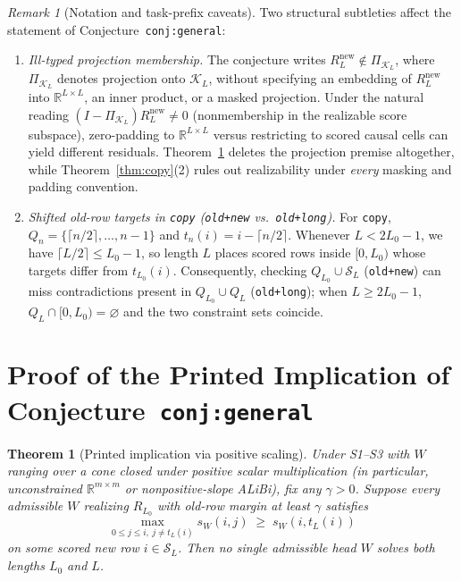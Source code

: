 \documentclass[11pt]{article}
\theoremstyle{plain}
\newtheorem{theorem}{Theorem}
\theoremstyle{definition}
\theoremstyle{remark}
\newtheorem{remark}{Remark}
\begin{document}
\begin{remark}[Notation and task-prefix caveats]\label{rmk:caveats}
Two structural subtleties affect the statement of Conjecture~\texttt{conj:general}:
\begin{enumerate}[label=\textup{(\arabic*)},itemsep=2pt]
\item \emph{Ill-typed projection membership.} The conjecture writes $R_L^{\mathrm{new}} \notin \Pi_{\mathcal{K}_L}$, where $\Pi_{\mathcal{K}_L}$ denotes projection onto $\mathcal{K}_L$, without specifying an embedding of $R_L^{\mathrm{new}}$ into $\mathbb{R}^{L \times L}$, an inner product, or a masked projection. Under the natural reading $(I - \Pi_{\mathcal{K}_L}) R_L^{\mathrm{new}} \neq 0$ (nonmembership in the realizable score subspace), zero-padding to $\mathbb{R}^{L \times L}$ versus restricting to scored causal cells can yield different residuals. Theorem~\ref{thm:printed} deletes the projection premise altogether, while Theorem~\ref{thm:copy}(2) rules out realizability under \emph{every} masking and padding convention.
\item \emph{Shifted old-row targets in \texttt{copy} (\texttt{old+new} vs.\ \texttt{old+long}).} For \texttt{copy}, $Q_n = \{\lceil n/2 \rceil, \dots, n - 1\}$ and $t_n(i) = i - \lceil n/2 \rceil$. Whenever $L < 2L_0 - 1$, we have $\lceil L/2 \rceil \le L_0 - 1$, so length $L$ places scored rows inside $[0, L_0)$ whose targets differ from $t_{L_0}(i)$. Consequently, checking $Q_{L_0} \cup \mathcal{S}_L$ (\texttt{old+new}) can miss contradictions present in $Q_{L_0} \cup Q_L$ (\texttt{old+long}); when $L \ge 2L_0 - 1$, $Q_L \cap [0, L_0) = \varnothing$ and the two constraint sets coincide.
\end{enumerate}
\end{remark}

\section{Proof of the Printed Implication of Conjecture~\texttt{conj:general}}

\begin{theorem}[Printed implication via positive scaling]\label{thm:printed}
Under S1--S3 with $W$ ranging over a cone closed under positive scalar multiplication (in particular, unconstrained $\mathbb{R}^{m \times m}$ or nonpositive-slope ALiBi), fix any $\gamma > 0$. Suppose every admissible $W$ realizing $R_{L_0}$ with old-row margin at least $\gamma$ satisfies
\[
\max_{0 \le j \le i,\ j \neq t_L(i)} s_W(i, j) \;\ge\; s_W(i, t_L(i))
\]
on some scored new row $i \in \mathcal{S}_L$. Then no single admissible head $W$ solves both lengths $L_0$ and $L$.
\end{theorem}
\end{document}
